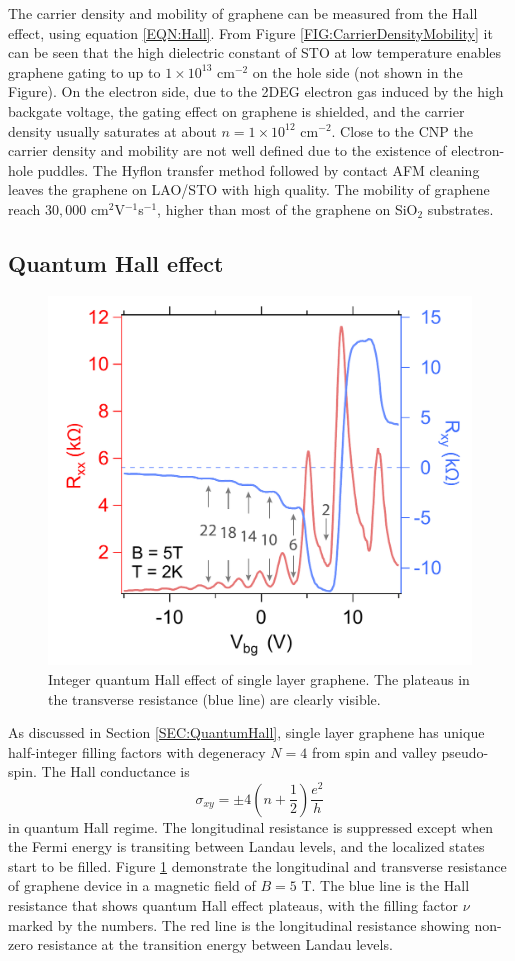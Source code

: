 \documentclass[pdflatex, sectionletters, 12pt]{pittetd}    %
\begin{document}
The carrier density and mobility of graphene can be measured from the Hall effect, using equation \ref{EQN:Hall}. From Figure \ref{FIG:CarrierDensityMobility} it can be seen that the high dielectric constant of STO at low temperature enables graphene gating to up to $1 \times 10^{13}$ $\mathrm{cm}^{-2}$ on the hole side (not shown in the Figure). On the electron side, due to the 2DEG electron gas induced by the high backgate voltage, the gating effect on graphene is shielded, and the carrier density usually saturates at about $n = 1 \times 10^{12}$ $\mathrm{cm}^{-2}$. Close to the CNP the carrier density and mobility are not well defined due to the existence of electron-hole puddles. The Hyflon transfer method followed by contact AFM cleaning leaves the graphene on LAO/STO with high quality. The mobility of graphene reach $30,000$ cm$^{2}$V$^{-1}$s$^{-1}$, higher than most of the graphene on SiO$_2$ substrates\cite{li2016method}. 

\subsection{Quantum Hall effect}

\begin{figure}[h!]
	\centering
	\includegraphics[width=.55\textwidth]{Drawing/HallResistance.pdf}
	\caption{Integer quantum Hall effect of single layer graphene. The plateaus in the transverse resistance (blue line) are clearly visible.}
	\label{FIG:HallResistance}
\end{figure}

As discussed in Section \ref{SEC:QuantumHall}, single layer graphene has unique half-integer filling factors with degeneracy $N = 4$ from spin and valley pseudo-spin. The Hall conductance is
$$
\sigma_{xy} = \pm 4\left(n + \frac{1}{2}\right)\frac{e^2}{h}
$$
in quantum Hall regime. The longitudinal resistance is suppressed except when the Fermi energy is transiting between Landau levels, and the localized states start to be filled. Figure \ref{FIG:HallResistance} demonstrate the longitudinal and transverse resistance of graphene device in a magnetic field of $B = 5$ T. The blue line is the Hall resistance that shows quantum Hall effect plateaus, with the filling factor $\nu$ marked by the numbers. The red line is the longitudinal resistance showing non-zero resistance at the transition energy between Landau levels.
\end{document}
